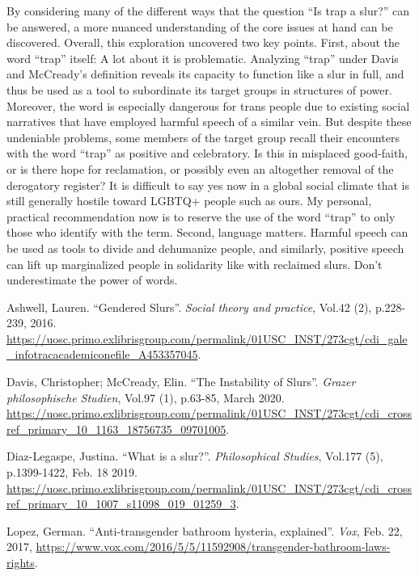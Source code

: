 \documentclass[12pt, letterpaper]{article}
\begin{document}
\begin{mla}
By considering many of the different ways that the question ``Is trap a
slur?'' can be answered, a more nuanced understanding of the core issues at
hand can be discovered. Overall, this exploration uncovered two key points.
First, about the word ``trap'' itself: A lot about it is problematic.
Analyzing ``trap'' under Davis and McCready's definition reveals its capacity
to function like a slur in full, and thus be used as a tool to subordinate
its target groups in structures of power. Moreover, the word is especially
dangerous for trans people due to existing social narratives that have
employed harmful speech of a similar vein. But despite these undeniable
problems, some members of the target group recall their encounters with the
word ``trap'' as positive and celebratory. Is this in misplaced good-faith,
or is there hope for reclamation, or possibly even an altogether removal of
the derogatory register? It is difficult to say yes now in a global social
climate that is still generally hostile toward LGBTQ+ people such as ours. My
personal, practical recommendation now is to reserve the use of the word
``trap'' to only those who identify with the term. Second, language matters.
Harmful speech can be used as tools to divide and dehumanize people, and
similarly, positive speech can lift up marginalized people in solidarity like
with reclaimed slurs. Don't underestimate the power of words.


\begin{workscited}
	\bibent Ashwell, Lauren. ``Gendered Slurs''.
	\textit{Social theory and practice}, Vol.42 (2), p.228-239, 2016.
	\url{https://uosc.primo.exlibrisgroup.com/permalink/01USC_INST/273cgt/cdi_gale_infotracacademiconefile_A453357045}.

	\bibent Davis, Christopher; McCready, Elin. ``The Instability of Slurs''.
	\textit{Grazer philosophische Studien}, Vol.97 (1), p.63-85, March 2020.
	\url{https://uosc.primo.exlibrisgroup.com/permalink/01USC_INST/273cgt/cdi_crossref_primary_10_1163_18756735_09701005}.

	\bibent Diaz-Legaspe, Justina. ``What is a slur?''.
	\textit{Philosophical Studies}, Vol.177 (5), p.1399-1422, Feb. 18 2019.
	\url{https://uosc.primo.exlibrisgroup.com/permalink/01USC_INST/273cgt/cdi_crossref_primary_10_1007_s11098_019_01259_3}.

	\bibent Lopez, German. ``Anti-transgender bathroom hysteria, explained''.
	\textit{Vox}, Feb. 22, 2017,
	\url{https://www.vox.com/2016/5/5/11592908/transgender-bathroom-laws-rights}.


\end{workscited}
\end{mla}
\end{document}
